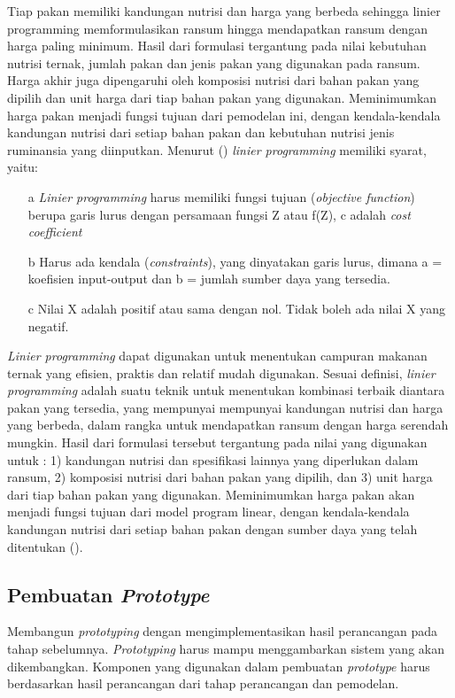 Tiap pakan memiliki kandungan nutrisi dan harga yang berbeda sehingga linier programming memformulasikan ransum hingga mendapatkan ransum dengan harga paling minimum. Hasil dari formulasi tergantung pada nilai kebutuhan nutrisi ternak, jumlah pakan dan jenis pakan yang digunakan pada ransum. Harga akhir juga dipengaruhi oleh komposisi nutrisi dari bahan pakan yang dipilih dan unit harga dari tiap bahan pakan yang digunakan. Meminimumkan harga pakan menjadi fungsi tujuan dari pemodelan ini, dengan kendala-kendala kandungan nutrisi dari setiap bahan pakan dan kebutuhan nutrisi jenis ruminansia yang diinputkan.
Menurut \citeauthor{Hidayat2013} (\cite*{Hidayat2013}) \textit{linier programming }memiliki syarat, yaitu:
\begin{enumerate}[noitemsep] 
	\item[a] \textit{Linier programming }harus memiliki fungsi tujuan (\textit{objective function}) berupa garis lurus dengan persamaan fungsi Z atau f(Z), c adalah \textit{cost coefficient}
	\item[b] Harus ada kendala (\textit{constraints}), yang dinyatakan garis lurus, dimana a = koefisien input-output dan b = jumlah sumber daya yang tersedia. 
	\item[c] Nilai X adalah positif atau sama dengan nol. Tidak boleh ada nilai X yang negatif.
\end{enumerate}
\textit{Linier programming }dapat digunakan untuk menentukan campuran makanan ternak yang efisien, praktis dan relatif mudah digunakan. Sesuai definisi, \textit{linier programming} adalah suatu teknik untuk menentukan kombinasi terbaik diantara pakan yang tersedia, yang mempunyai mempunyai kandungan nutrisi dan harga yang berbeda, dalam rangka untuk mendapatkan ransum dengan harga serendah mungkin. Hasil dari formulasi tersebut tergantung pada nilai yang digunakan untuk : 1) kandungan nutrisi dan spesifikasi lainnya yang diperlukan dalam ransum, 2) komposisi nutrisi dari bahan pakan yang dipilih, dan 3) unit harga dari tiap bahan pakan yang digunakan. Meminimumkan harga pakan akan menjadi fungsi tujuan dari model program linear, dengan kendala-kendala kandungan nutrisi dari setiap bahan pakan dengan sumber daya yang telah ditentukan (\cite{Hidayat2013}).

\subsection*{Pembuatan \textit{Prototype}}

Membangun \textit{prototyping} dengan mengimplementasikan hasil perancangan pada tahap sebelumnya. \textit{Prototyping} harus mampu menggambarkan sistem yang akan dikembangkan. Komponen yang digunakan dalam pembuatan \textit{prototype} harus berdasarkan hasil perancangan dari tahap perancangan dan pemodelan.


